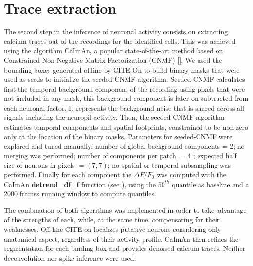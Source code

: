 \section{Trace extraction}
\label{chap3:sec:5:trace_extraction}
The second step in the inference of neuronal activity consists on extracting calcium traces out of the recordings for the identified cells. 
This was achieved using the algorithm CaImAn, a popular state-of-the-art method based on Constrained Non-Negative Matrix Factorization (CNMF) [\cite{giovannucci2019}].
We used the bounding boxes generated offline by CITE-On to build binary masks that were used as seeds to initialize the seeded-CNMF algorithm.
Seeded-CNMF calculates first the temporal background component of the recording using pixels that were not included in any mask, this background component is later on subtracted from each neuronal factor. 
It represents the background noise that is shared across all signals including the neuropil activity.
Then, the seeded-CNMF algorithm estimates temporal components and spatial footprints, constrained to be non-zero only at the location of the binary masks.
Parameters for seeded-CNMF were explored and tuned manually: number of global background components = 2; no merging was performed; number of components per patch $= 4$ ; expected half size of neurons in pixels $= (7,7)$; no spatial or temporal subsampling was performed.
Finally for each component the $\Delta F/F_0$ was computed with the CaImAn \textbf{detrend\_df\_f} function (see \cite{giovannucci2019}), using the $50^{th}$ quantile as baseline and a 2000 frames running window to compute quantiles.  

The combination of both algorithms was implemented in order to take advantage of the strengths of each, while, at the same time, compensating for their weaknesses.
Off-line CITE-on localizes putative neurons considering only anatomical aspect, regardless of their activity profile.
CaImAn then refines the segmentation for each binding box and provides denoised calcium traces. 
Neither deconvolution nor spike inference were used. 
